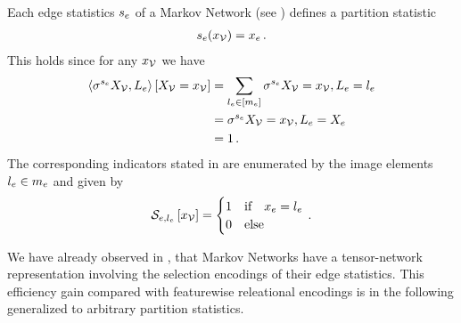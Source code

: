 \begin{example}
    Each edge statistics $s_{e}$ of a Markov Network (see ) defines a partition statistic
    \begin{align*}
        s_{e}(x_{\mathcal{V}}) = x_{e} \, .
    \end{align*}
    This holds since for any $x_{\mathcal{V}}$ we have
    \begin{align*}
        \left\langle \sigma^{s_{e}}{X_{\mathcal{V}},L_{e}}\right\rangle \left[ X_{\mathcal{V}}=x_{\mathcal{V}} \right]
        &= \sum_{l_{e}\in[m_{e}]} \sigma^{s_{e}}{X_{\mathcal{V}}=x_{\mathcal{V}},L_{e}=l_{e}} \\
        &= \sigma^{s_{e}}{X_{\mathcal{V}}=x_{\mathcal{V}},L_{e}=X_{e}} \\
        &= 1 \, .
    \end{align*}
    The corresponding indicators stated in  are enumerated by the image elements $l_{e}\in m_{e}$ and given by
    \begin{align*}
        \mathcal{S}_{e,l_{e}}\left[x_{\mathcal{V}}\right]
        = \begin{cases}
              1 & \text{if}\quad x_{e} = l_{e} \\
              0 & \text{else}
        \end{cases} \, .
    \end{align*}
\end{example}

We have already observed in , that Markov Networks have a tensor-network representation involving the selection encodings of their edge statistics.
This efficiency gain compared with featurewise releational encodings is in the following generalized to arbitrary partition statistics.

